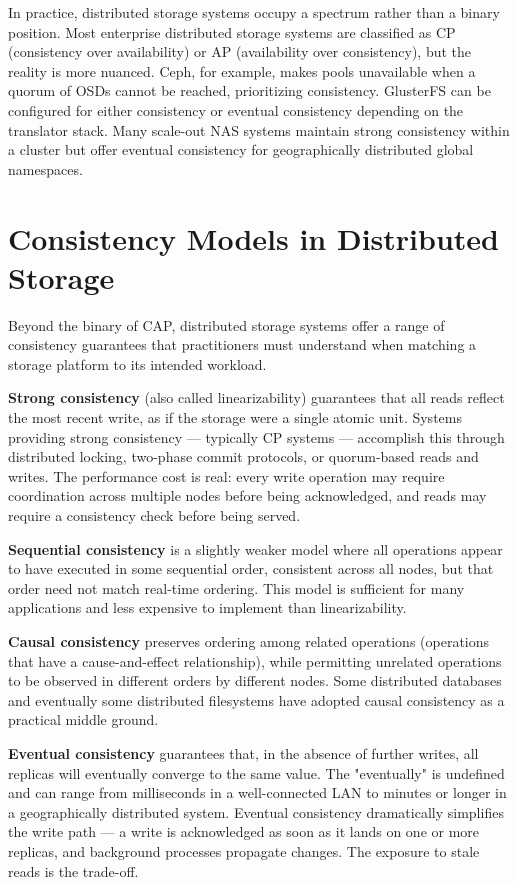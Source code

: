 In practice, distributed storage systems occupy a spectrum rather than a binary position. Most enterprise distributed storage systems are classified as CP (consistency over availability) or AP (availability over consistency), but the reality is more nuanced. Ceph, for example, makes pools unavailable when a quorum of OSDs cannot be reached, prioritizing consistency. GlusterFS can be configured for either consistency or eventual consistency depending on the translator stack. Many scale-out NAS systems maintain strong consistency within a cluster but offer eventual consistency for geographically distributed global namespaces.

\section{Consistency Models in Distributed Storage}
Beyond the binary of CAP, distributed storage systems offer a range of consistency guarantees that practitioners must understand when matching a storage platform to its intended workload.

\textbf{Strong consistency} (also called linearizability) guarantees that all reads reflect the most recent write, as if the storage were a single atomic unit. Systems providing strong consistency --- typically CP systems --- accomplish this through distributed locking, two-phase commit protocols, or quorum-based reads and writes. The performance cost is real: every write operation may require coordination across multiple nodes before being acknowledged, and reads may require a consistency check before being served.

\textbf{Sequential consistency} is a slightly weaker model where all operations appear to have executed in some sequential order, consistent across all nodes, but that order need not match real-time ordering. This model is sufficient for many applications and less expensive to implement than linearizability.

\textbf{Causal consistency} preserves ordering among related operations (operations that have a cause-and-effect relationship), while permitting unrelated operations to be observed in different orders by different nodes. Some distributed databases and eventually some distributed filesystems have adopted causal consistency as a practical middle ground.

\textbf{Eventual consistency} guarantees that, in the absence of further writes, all replicas will eventually converge to the same value. The "eventually" is undefined and can range from milliseconds in a well-connected LAN to minutes or longer in a geographically distributed system. Eventual consistency dramatically simplifies the write path --- a write is acknowledged as soon as it lands on one or more replicas, and background processes propagate changes. The exposure to stale reads is the trade-off.

